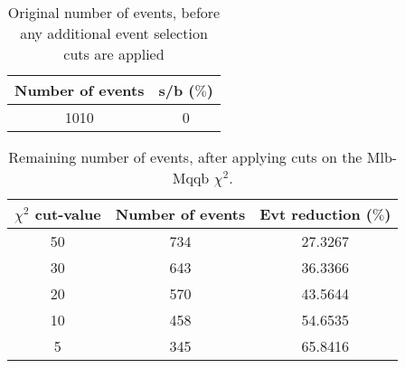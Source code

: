 \documentclass{article}
\begin{document}
 

 \begin{abstract} 
 
   The tables in this document represent the influence of the additional event selection cuts that were applied in order to reduce the number of selected events for CPU reasons. \\ 
   The considered cuts are rather basic and are merely developed to reduce the number of so-called wrong events \\ 
   \begin{itemize} 
     \item Cut on Mlb-Mqqb $\chi^{2}$ distribution 
     \item Cut on top and W-mass window 
   \end{itemize} 
 
   \textbf{Created on :} \today 
 \end{abstract} 
 
 \begin{table}[h!t] 
  \caption{Original number of events, before any additional event selection cuts are applied} 
  \centering 
   \begin{tabular}{c|c} 
     Number of events    & s/b ($\%$)     \\ 
     \hline
     1010  & 0 
 
   \end{tabular} 
 \end{table} 
 
 \begin{table}[h!t] 
  \caption{Remaining number of events, after applying cuts on the Mlb-Mqqb $\chi^{2}$.} 
  \centering 
   \begin{tabular}{c|c|c|} 
     $\chi^{2}$ cut-value    & Number of events  & Evt reduction ($\%$)    \\ 
     \hline
     50  &   734  &  27.3267 \\ 
     30  &   643  &  36.3366 \\ 
     20  &   570  &  43.5644 \\ 
     10  &   458  &  54.6535 \\ 
     5  &   345  &  65.8416 \\ 
   \end{tabular} 
 \end{table} 
 
\end{document}

